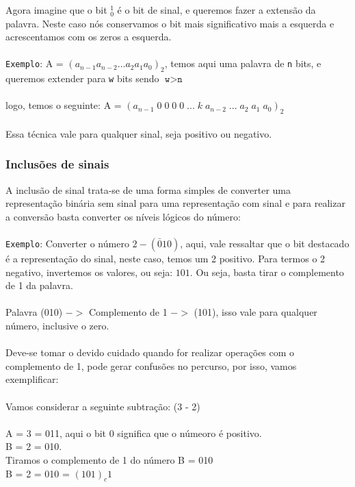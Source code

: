 \documentclass[12pt, onecolumn]{article}
\begin{document}
	Agora imagine que o bit $_0^1$ é o bit de sinal, e queremos fazer a
	extensão da palavra. Neste caso nós conservamos o bit mais
	significativo mais a esquerda e acrescentamos com os zeros a esquerda.\\
	\\
	\texttt{Exemplo}: A = $(a_{n-1} a_{n-2} ... a_2 a_1 a_0)_2$, temos aqui
	uma palavra de \texttt{n} bits, e queremos extender para \texttt{w} bits
	sendo $\texttt{w} > \texttt{n}$\\
	\\
	logo, temos o seguinte: 
	A = $(a_{n-1}\;0\;0\;0\;0\;...\;k\;a_{n-2}\;...\;a_2\;a_1\;a_0)_2$\\
	\\
	Essa técnica vale para qualquer sinal, seja positivo ou negativo.
	
		\subsubsection{Inclusões de sinais}
	A inclusão de sinal trata-se de uma forma simples de converter uma 
	representação binária sem sinal para uma representação com sinal e 
	para realizar a conversão basta converter os níveis lógicos do número:\\
	\\
	\texttt{Exemplo}: Converter o número $2 - (\bar{0}10)$, aqui, vale ressaltar
	que o bit destacado é a representação do sinal, neste caso, temos um 2 
	positivo. Para termos o 2 negativo, invertemos os valores, ou seja: 
	$101$. Ou seja, basta tirar o complemento de 1 da palavra. \\
	\\
	Palavra (010) $->$ Complemento de 1 $->$ (101), isso vale para qualquer número,
	inclusive o zero.\\
	\\
	Deve-se tomar o devido cuidado quando for realizar operações com o 
	complemento de 1, pode gerar confusões no percurso, por isso, vamos
	exemplificar: \\
	\\
	Vamos considerar a seguinte subtração: (3 - 2)\\
	\\
	A = 3 = 011, aqui o bit 0 significa que o númeoro é positivo.\\
	B = 2 = 010.\\
	Tiramos o complemento de 1 do número B = 010\\
	B = 2 = 010 = $(101)_c1$\\
	\\
\end{document}
